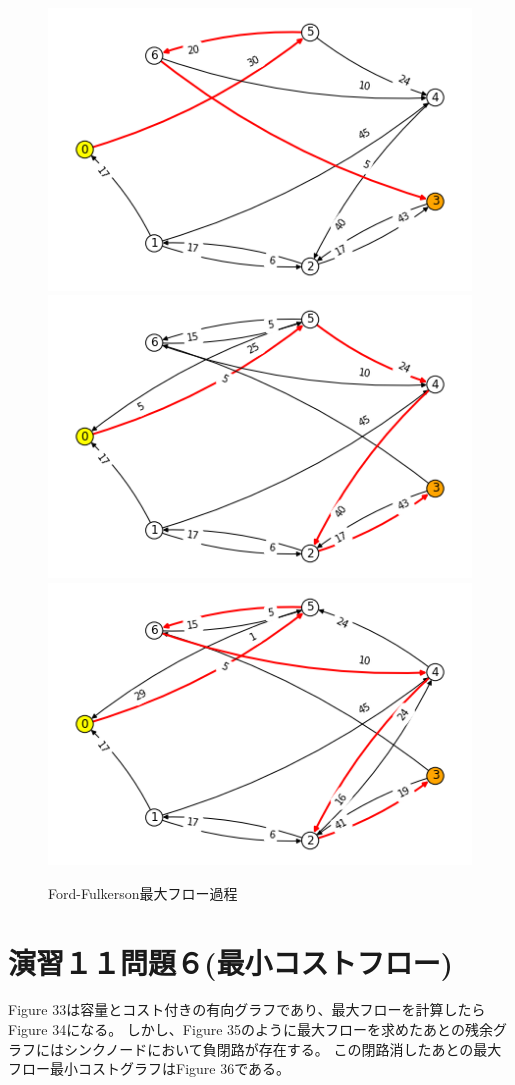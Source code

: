 \documentclass{report}
\begin{document}
\begin{CJK}{UTF8}{min}
\begin{figure}
        \includegraphics[width=.49\textwidth]{data/ex11-MF-2.png}
        \\[\smallskipamount]
        \includegraphics[width=.49\textwidth]{data/ex11-MF-3.png}\hfill
        \includegraphics[width=.49\textwidth]{data/ex11-MF-4.png}
        \caption{Ford-Fulkerson最大フロー過程}
    \end{figure}

    \clearpage
    \section*{演習１１問題６(最小コストフロー)}
    Figure 33は容量とコスト付きの有向グラフであり、最大フローを計算したらFigure 34になる。
    しかし、Figure 35のように最大フローを求めたあとの残余グラフにはシンクノードにおいて負閉路が存在する。
    この閉路消したあとの最大フロー最小コストグラフはFigure 36である。


\end{CJK}
\end{document}
